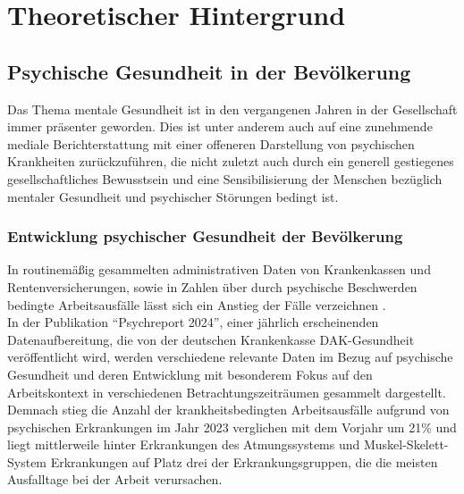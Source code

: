 \chapter{Theoretischer Hintergrund}\label{sec:theoretischer_hintergrund}


\section{Psychische Gesundheit in der Bevölkerung}\label{subsec:psychische_gesundheit}

Das Thema mentale Gesundheit ist in den vergangenen Jahren in der Gesellschaft immer präsenter geworden. Dies ist unter anderem auch auf eine zunehmende mediale Berichterstattung mit einer offeneren Darstellung von psychischen Krankheiten zurückzuführen, die nicht zuletzt auch durch ein generell gestiegenes gesellschaftliches Bewusstsein und eine Sensibilisierung der Menschen bezüglich mentaler Gesundheit und psychischer Störungen bedingt ist.

\subsection{Entwicklung psychischer Gesundheit der Bevölkerung}\label{subsubsec:entwicklung_psychische_gesundheit}

In routinemäßig gesammelten administrativen Daten von Krankenkassen und Rentenversicherungen, 
sowie in Zahlen über durch psychische Beschwerden bedingte Arbeitsausfälle 
lässt sich ein Anstieg der Fälle verzeichnen 
\parencite{latex:arzteblatt}
\parencite{latex:arzteblatt,latex:dak}. \\ %
In der Publikation “Psychreport 2024”, einer jährlich erscheinenden Datenaufbereitung, 
die von der deutschen Krankenkasse DAK-Gesundheit veröffentlicht wird, 
werden verschiedene relevante Daten im Bezug auf psychische Gesundheit 
und deren Entwicklung mit besonderem Fokus auf den Arbeitskontext 
in verschiedenen Betrachtungszeiträumen gesammelt dargestellt. \\

Demnach stieg die Anzahl der krankheitsbedingten Arbeitsausfälle 
aufgrund von psychischen Erkrankungen im Jahr 2023 verglichen mit dem Vorjahr um 21\% 
und liegt mittlerweile hinter Erkrankungen des Atmungssystems 
und Muskel-Skelett-System Erkrankungen auf Platz drei der Erkrankungsgruppen, 
die die meisten Ausfalltage bei der Arbeit verursachen. 

